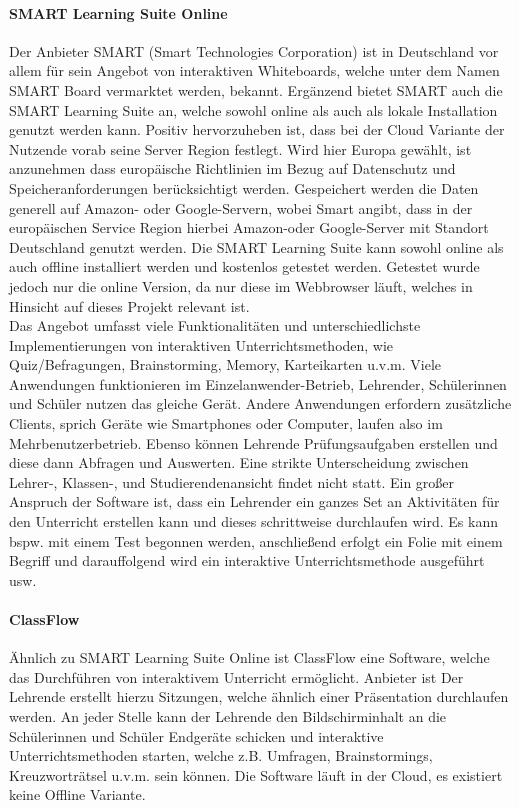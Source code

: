 \paragraph{SMART Learning Suite Online}
Der Anbieter SMART (Smart Technologies Corporation) ist in Deutschland vor allem für sein Angebot von interaktiven Whiteboards, welche unter dem Namen SMART Board vermarktet werden, bekannt. Ergänzend bietet SMART auch die SMART Learning Suite an, welche sowohl online als auch als lokale Installation genutzt werden kann. Positiv hervorzuheben ist, dass bei der Cloud Variante der Nutzende vorab seine Server Region festlegt. Wird hier Europa gewählt, ist anzunehmen dass europäische Richtlinien im Bezug auf Datenschutz und Speicheranforderungen berücksichtigt werden. Gespeichert werden die Daten generell auf Amazon- oder Google-Servern, wobei Smart angibt, dass in der europäischen Service Region hierbei Amazon-oder Google-Server mit Standort Deutschland genutzt werden\cite{Technologies2019}. Die SMART Learning Suite kann sowohl online als auch offline installiert werden und kostenlos getestet werden. Getestet wurde jedoch nur die online Version, da nur diese im Webbrowser läuft, welches in Hinsicht auf dieses Projekt relevant ist. \\ Das Angebot umfasst viele Funktionalitäten und unterschiedlichste Implementierungen von  interaktiven Unterrichtsmethoden, wie Quiz/Befragungen, Brainstorming, Memory, Karteikarten u.v.m. Viele Anwendungen funktionieren im Einzelanwender-Betrieb, Lehrender, Schülerinnen und Schüler nutzen das gleiche Gerät. Andere Anwendungen erfordern zusätzliche Clients, sprich Geräte wie Smartphones oder Computer, laufen also im Mehrbenutzerbetrieb. Ebenso können Lehrende Prüfungsaufgaben erstellen und diese dann Abfragen und Auswerten. Eine strikte Unterscheidung zwischen Lehrer-, Klassen-, und Studierendenansicht findet nicht statt. Ein großer Anspruch der Software ist, dass ein Lehrender ein ganzes Set an Aktivitäten für den Unterricht erstellen kann und dieses schrittweise durchlaufen wird. Es kann bspw. mit einem Test begonnen werden, anschließend erfolgt ein Folie mit einem Begriff und darauffolgend wird ein interaktive Unterrichtsmethode ausgeführt usw. 

\paragraph{ClassFlow}
Ähnlich zu SMART Learning Suite Online ist ClassFlow eine Software, welche das 
Durchführen von interaktivem Unterricht ermöglicht. Anbieter ist  Der Lehrende erstellt hierzu Sitzungen, welche ähnlich einer Präsentation durchlaufen werden. An jeder Stelle kann der Lehrende den Bildschirminhalt an die Schülerinnen und Schüler Endgeräte schicken und interaktive Unterrichtsmethoden starten, welche z.B. Umfragen, Brainstormings, Kreuzworträtsel u.v.m. sein können. Die Software läuft in der Cloud, es existiert keine Offline Variante. 

